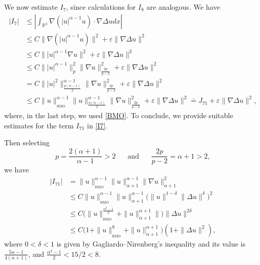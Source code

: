 \documentclass[a4paper]{article}
\newcommand{\R}{\mathbb{R}}
\begin{document}
We now estimate $I_7$, since calculations for $I_8$ are analogous. We
have
\begin{equation} \label{I7}
  \begin{aligned}
    |I_7|& \leq \left|\int_{\R^3}\nabla (|u|^{\alpha-1}u)\cdot \nabla
      \Delta u dx\right|
    \\
    & \leq C\|\nabla (|u|^{\alpha-1}u)\|^2 + \varepsilon\| \nabla
    \Delta u \|^2
    \\
    & \leq C \| |u|^{\alpha-1}\nabla u\|^2 + \varepsilon\| \nabla
    \Delta u \|^2
    \\
    &\leq C \| |u|^{\alpha-1}\|_p^2\|\nabla u\|_{\frac{2p}{p-2}}^2 +
    \varepsilon\| \nabla \Delta u \|^2
    \\
    & = C \| |u|^2\|_{\frac{p(\alpha-1)}{2}}^{\alpha-1} \|\nabla
    u\|_{\frac{2p}{p-2}}^2 + \varepsilon\| \nabla \Delta u \|^2
    \\
    &\leq C\|u\|_{{}_{\textrm{BMO}}}^{\alpha
      -1}\|u\|_{\frac{p(\alpha-1)}{2}}^{\alpha-1}\|\nabla
    u\|_{\frac{2p}{p-2}}^2 + \varepsilon\| \nabla \Delta u \|^2 \doteq
    J_{71} + \varepsilon\| \nabla \Delta u \|^2,
  \end{aligned}
\end{equation}
where, in the last step, we used \eqref{BMO}.  To conclude, we provide
suitable estimates for the term $I_{71}$ in \eqref{I7}.

Then selecting
\begin{equation*}
  p=\frac{2(\alpha+1)}{\alpha-1}> 2\,\,\quad  \textrm{ and }\,\,\quad \frac{2p}{p-2}=\alpha+1 >2, 
\end{equation*}
we have
\begin{equation} \label{J71}
  \begin{aligned}
    |I_{71}|& = \|u\|_{{}_{\textrm{BMO}}}^{\alpha
      -1}\|u\|_{\alpha+1}^{\alpha-1}\|\nabla u\|_{\alpha+1}^2
    \\
    &\leq C
    \|u\|_{{}_{\textrm{BMO}}}^{\alpha-1}\|u\|_{\alpha+1}^{\alpha-1}\big(\|u\|^{1-\delta}
    \|\Delta u\|^\delta \big)^2
    \\
    &\leq C\big( \|u\|_{{}_{\textrm{BMO}}}^{\frac{\alpha^2-1}{2}}
    +\|u\|_{\alpha+1}^{\alpha+1}\|\big) \|\Delta u\|^{2\delta}
    \\
    &\leq C\big(1+\|u\|_{{}_{\textrm{BMO}}}^{8} +
    \|u\|_{\alpha+1}^{\alpha+1}\Big)(1+\|\Delta u\|^2),
  \end{aligned}
\end{equation}
%
where $0<\delta<1$ is given by Gagliardo--Nirenberg\rq{}s inequality and its
value is $\frac{5\alpha-1}{4(\alpha+1)}$, and
$\frac{\alpha^2-1}{2} < 15/2 <8$.
    
\end{document}
